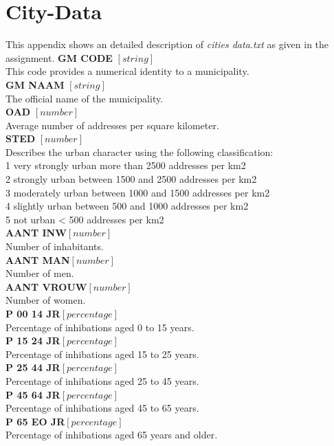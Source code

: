 \section{City-Data}
This appendix shows an detailed description of  \emph{ cities data.txt} as given in the assignment. 
\textbf{GM CODE} $[string]$ \\
This code provides a numerical identity to a municipality. \\
\textbf{GM NAAM} $[string]$ \\
The official name of the municipality. \\
\textbf{OAD} $[number]$ \\
Average number of addresses per square kilometer. \\
\textbf{STED} $[number]$ \\
Describes the urban character using the following classification: \\
1 very strongly urban  more than 2500 addresses per km2 \\
2 strongly urban between 1500 and  2500 addresses per km2 \\
3 moderately urban between 1000 and 1500 addresses per km2 \\
4 slightly urban between 500 and  1000 addresses per km2 \\
5 not urban < 500 addresses per km2 \\
\textbf{AANT INW}$ [number] $ \\
Number of inhabitants. \\
\textbf{AANT MAN}$ [number]$ \\
Number of men. \\
\textbf{AANT VROUW}$ [number]$ \\
Number of women. \\
\textbf{P 00 14 JR}$ [percentage]$ \\
Percentage of inhibations aged 0 to 15 years. \\
\textbf{P 15 24 JR}$ [percentage]$ \\
Percentage of inhibations aged 15 to 25 years. \\
\textbf{P 25 44 JR}$ [percentage]$ \\
Percentage of inhibations aged 25 to 45 years. \\
\textbf{P 45 64 JR}$ [percentage]$ \\
Percentage of inhibations aged 45 to 65 years. \\
\textbf{P 65 EO JR}$ [percentage]$ \\
Percentage of inhibations aged 65 years and older. \\
